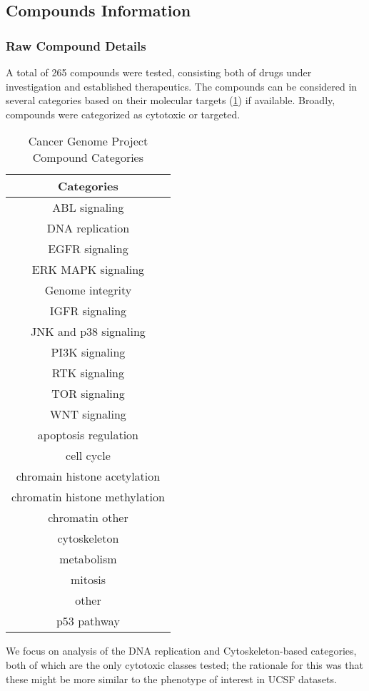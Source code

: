 \subsection{Compounds Information}

\subsubsection{Raw Compound Details}

A total of 265 compounds were tested, consisting both of drugs under
investigation and established therapeutics. The compounds can be
considered in several categories based on their molecular targets (\ref{cmpnds}) if
available. Broadly, compounds were categorized as cytotoxic or
targeted.

\begin{table}
\begin{center}
\begin{tabular}{|c|} \hline
\textbf{Categories} \\ \hline
ABL signaling\\
DNA replication\\
EGFR signaling\\
ERK MAPK signaling\\
Genome integrity\\
IGFR signaling\\
JNK and p38 signaling\\
PI3K signaling\\
RTK signaling\\
TOR signaling\\
WNT signaling\\
apoptosis regulation\\
cell cycle\\
chromain  histone acetylation\\
chromatin  histone methylation\\
chromatin  other\\
cytoskeleton\\
metabolism\\
mitosis\\
other\\
p53 pathway \\ \hline
\end{tabular}
\end{center}
\caption{Cancer Genome Project Compound Categories} \label{cmpnds}
\end{table}

We focus on analysis of the DNA replication and Cytoskeleton-based
categories, both of which are the only cytotoxic classes tested; the
rationale for this was that these might be more similar to the
phenotype of interest in UCSF datasets.

